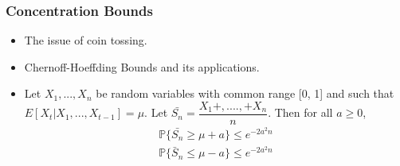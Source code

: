 \begin{frame}
\frametitle{Concentration Bounds}
\begin{itemize}
\item<1-> The issue of coin tossing.
\item<2-> Chernoff-Hoeffding Bounds and its applications.
\item<3-> Let $X_{1}, . . . , X_{n}$ be random variables with common
range [0, 1] and such that $E[X_{t} |X_{1}, . . . , X_{t-1}] = \mu.$ Let $\bar{S_n} = \dfrac{X_{1} +,....,+ X_{n}}{n}$. Then for all $a \geq 0$,
\begin{align*}
\mathbb{P} \lbrace \bar{S_{n}} \geq \mu + a \rbrace \leq e^{-2a^{2}n}\\
\mathbb{P}\lbrace \bar{S}_{n} \leq \mu - a \rbrace \leq e^{-2a^{2}n}
\end{align*}
\end{itemize}
\end{frame}